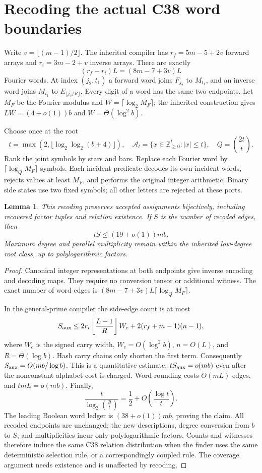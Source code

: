 \documentclass[11pt]{article}
\newtheorem{lemma}{Lemma}
\begin{document}
\section{Recoding the actual C38 word boundaries}
Write $v=\lfloor(m-1)/2\rfloor$. The inherited compiler has
$r_f=5m-5+2v$ forward arrays and $r_i=3m-2+v$ inverse arrays.
There are exactly
\[
 (r_f+r_i)L=(8m-7+3v)L
\]
Fourier words. At index $(j_2,t_1)$ a forward word joins $F_{j_2}$
to $M_{t_1}$, and an inverse word joins $M_{t_1}$ to
$E_{\lfloor j_2/R\rfloor}$. Every digit of a word has the same
two endpoints. Let $M_F$ be the Fourier modulus and
$W=\lceil\log_2 M_F\rceil$; the inherited construction gives
$LW=(4+o(1))b$ and $W=\Theta(\log^2b)$.

Choose once at the root
\[
 t=\max(2,\lfloor\log_2\log_2(b+4)\rfloor),\quad
 \mathcal A_t=\{x\in\mathbb Z_{\ge0}^t:|x|\le t\},\quad
 Q=\binom{2t}{t}.
\]
Rank the joint symbols by stars and bars. Replace each Fourier word by
$\lceil\log_Q M_F\rceil$ symbols. Each incident predicate decodes
its own incident words, rejects values at least $M_F$, and performs
the original integer arithmetic. Binary side states use two fixed
symbols; all other letters are rejected at these ports.

\begin{lemma}
This recoding preserves accepted assignments bijectively, including
recovered factor tuples and relation existence. If $S$ is the number
of recoded edges, then
\[
 tS\le(19+o(1))mb.
\]
Maximum degree and parallel multiplicity remain within the inherited
low-degree root class, up to polylogarithmic factors.
\end{lemma}
\begin{proof}
Canonical integer representations at both endpoints give inverse
encoding and decoding maps. They require no conversion tensor or
additional witness. The exact number of word edges is
$(8m-7+3v)L\lceil\log_QM_F\rceil$.

In the general-prime compiler the side-edge count is at most
\[
 S_{\rm aux}\le
 2r_i\left\lfloor\frac{L-1}{R}\right\rfloor W_c
 +2(r_f+m-1)(n-1),
\]
where $W_c$ is the signed carry width, $W_c=O(\log^2b)$,
$n=O(L)$, and $R=\Theta(\log b)$. Hash carry chains only shorten
the first term. Consequently $S_{\rm aux}=O(mb/\log b)$.
This is a quantitative estimate: $tS_{\rm aux}=o(mb)$ even
after the nonconstant alphabet cost is charged. Word rounding costs
$O(mL)$ edges, and $tmL=o(mb)$.
Finally,
\[
 \frac{t}{\log_2\binom{2t}{t}}
 =\frac12+O\left(\frac{\log t}{t}\right).
\]
The leading Boolean word ledger is $(38+o(1))mb$, proving the
claim. All recoded endpoints are unchanged; the new descriptions,
degree conversion from $b$ to $S$, and multiplicities incur only
polylogarithmic factors. Counts and witnesses therefore induce the
same C38 relation distribution when the finder uses the same
deterministic selection rule, or a correspondingly coupled rule.
The coverage argument needs existence and is unaffected by recoding.
\end{proof}
\end{document}
